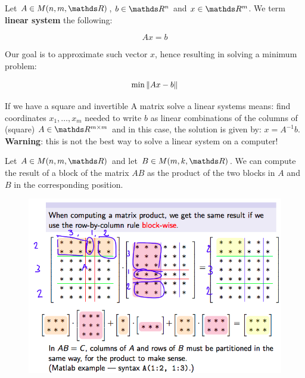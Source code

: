 \documentclass[computationalMathematics.tex]{subfiles}
\begin{document}
\begin{definition}
  Let $A \in M(n, m, \R)$, $b \in \R^n$ and $x \in \R^m$. We term \textbf{linear system} the following:

  \[
Ax = b
  \]
\end{definition}

\noindent Our goal is to approximate such vector $x$, hence resulting in solving a minimum problem:

\[
  \min\limits \left\lVert Ax - b\right\rVert
\]

If we have a square and invertible A matrix solve a linear systems means: find coordinates $x_1, \dots , x_m$ needed to write $b$ as linear combinations of the columns of (square) $A\in\R^{m\times m}$ and in this case, the solution is given by: $x = A^{-1}b$. \\
\textbf{Warning}: this is not the best way to solve a linear system on a computer!\\




\begin{definition}
  Let $A \in M(n,m, \R)$ and let $B \in M(m, k, \R)$. We can compute the result of a block of the matrix $AB$ as the product of the two blocks in $A$ and $B$ in the corresponding position.
\begin{figure}[H]
    \centering
    \includegraphics[scale=0.40]{pics/20sett/2.png}
    \label{fig:20sett2}
\end{figure}
\end{definition}
\end{document}
